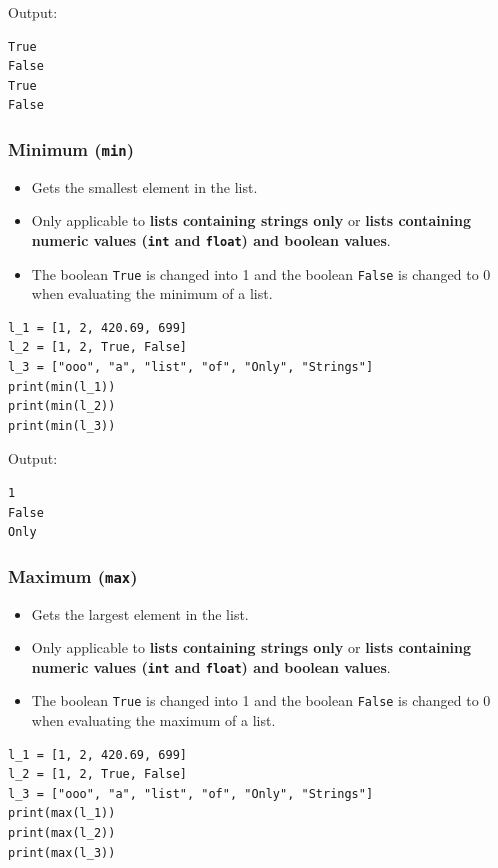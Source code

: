 \documentclass[11pt]{article}
\begin{document}
 \noindent Output:

\begin{verbatim}
True
False
True
False
\end{verbatim}

\subsubsection{Minimum (\texttt{min})}
\label{sec:orgdf87997}
\begin{itemize}
\item Gets the smallest element in the list.
\item Only applicable to \textbf{lists containing strings only} or \textbf{lists containing numeric values (\texttt{int} and \texttt{float}) and boolean values}.
\item The boolean \texttt{True} is changed into 1 and the boolean \texttt{False} is changed to 0 when evaluating the minimum of a list.
\end{itemize}

\begin{verbatim}
l_1 = [1, 2, 420.69, 699]
l_2 = [1, 2, True, False]
l_3 = ["ooo", "a", "list", "of", "Only", "Strings"]
print(min(l_1))
print(min(l_2))
print(min(l_3))
\end{verbatim}

 \noindent Output:

\begin{verbatim}
1
False
Only
\end{verbatim}

\subsubsection{Maximum (\texttt{max})}
\label{sec:org728c5ac}
\begin{itemize}
\item Gets the largest element in the list.
\item Only applicable to \textbf{lists containing strings only} or \textbf{lists containing numeric values (\texttt{int} and \texttt{float}) and boolean values}.
\item The boolean \texttt{True} is changed into 1 and the boolean \texttt{False} is changed to 0 when evaluating the maximum of a list.
\end{itemize}

\begin{verbatim}
l_1 = [1, 2, 420.69, 699]
l_2 = [1, 2, True, False]
l_3 = ["ooo", "a", "list", "of", "Only", "Strings"]
print(max(l_1))
print(max(l_2))
print(max(l_3))
\end{verbatim}
\end{document}
